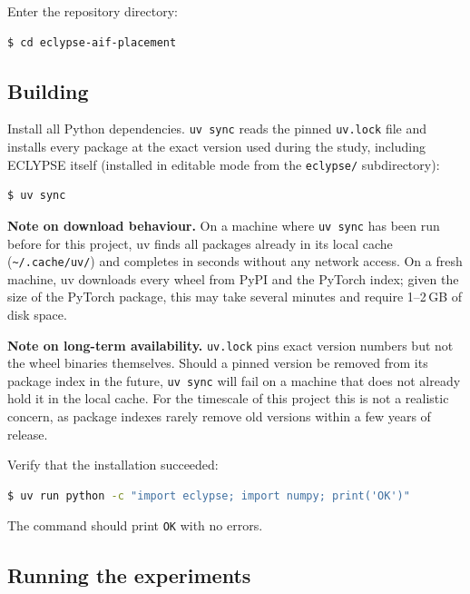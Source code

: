 \documentclass[11pt, a4paper]{article}
\begin{document}
\begin{appendices}
Enter the repository directory:

\begin{lstlisting}[language=bash]
$ cd eclypse-aif-placement
\end{lstlisting}

\subsection{Building}
\label{app:build}

Install all Python dependencies. \texttt{uv sync} reads the pinned
\texttt{uv.lock} file and installs every package at the exact version used
during the study, including ECLYPSE itself (installed in editable mode from the
\texttt{eclypse/} subdirectory):

\begin{lstlisting}[language=bash]
$ uv sync
\end{lstlisting}

\noindent\textbf{Note on download behaviour.}
On a machine where \texttt{uv sync} has been run before for this project, uv
finds all packages already in its local cache (\texttt{\textasciitilde/.cache/uv/})
and completes in seconds without any network access.
On a fresh machine, uv downloads every wheel from PyPI and the PyTorch index;
given the size of the PyTorch package, this may take several minutes and
require 1--2\,GB of disk space.

\noindent\textbf{Note on long-term availability.}
\texttt{uv.lock} pins exact version numbers but not the wheel binaries
themselves.
Should a pinned version be removed from its package index in the future,
\texttt{uv sync} will fail on a machine that does not already hold it in the
local cache.
For the timescale of this project this is not a realistic concern, as package
indexes rarely remove old versions within a few years of release.

Verify that the installation succeeded:

\begin{lstlisting}[language=bash]
$ uv run python -c "import eclypse; import numpy; print('OK')"
\end{lstlisting}

The command should print \texttt{OK} with no errors.

\subsection{Running the experiments}
\label{app:run}


\end{appendices}
\end{document}
